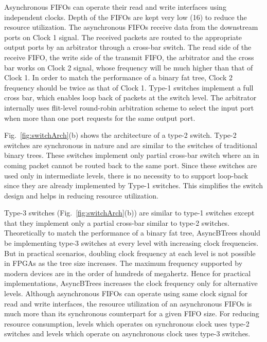 Asynchronous FIFOs can operate their read and write interfaces using independent clocks.
Depth of the FIFOs are kept very low (16) to reduce the resource utilization.
The asynchronous FIFOs receive data from the downstream ports on Clock 1 signal.
The received packets are routed to the appropriate output ports by an arbitrator through a cross-bar switch.
The read side of the receive FIFO, the write side of the transmit FIFO, the arbitrator and the cross bar works on Clock 2 signal, whose frequency will be much higher than that of Clock 1.
In order to match the performance of a binary fat tree, Clock 2 frequency should be twice as that of Clock 1.
Type-1 switches implement a full cross bar, which enables loop back of packets at the switch level.
The arbitrator internally uses flit-level round-robin arbitration scheme to select the input port when more than one port requests for the same output port.

Fig.~\ref{fig:switchArch}(b) shows the architecture of a type-2 switch.
Type-2 switches are synchronous in nature and are similar to the switches of traditional binary trees.
These switches implement only partial cross-bar switch where an in coming packet cannot be routed back to the same port.
Since these switches are used only in intermediate levels, there is no necessity to to support loop-back since they are already implemented by Type-1 switches.
This simplifies the switch design and helps in reducing resource utilization.

Type-3 switches (Fig.~\ref{fig:switchArch}(b)) are similar to type-1 switches except that they implement only a partial cross-bar similar to type-2 switches.
Theoretically to match the performance of a binary fat tree, AsyncBTrees should be implementing type-3 switches at every level with increasing clock frequencies.
But in practical scenarios, doubling clock frequency at each level is not possible in FPGAs as the tree size increases.
The maximum frequency supported by modern devices are in the order of hundreds of megahertz.
Hence for practical implementations, AsyncBTrees increases the clock frequency only for alternative levels. 
Although asynchronous FIFOs can operate using same clock signal for read and write interfaces, the resource utilization of an asynchronous FIFOs is much more than its synchronous counterpart for a given FIFO size.
For reducing resource consumption, levels which operates on synchronous clock uses type-2 switches and levels which operate on asynchronous clock uses type-3 switches.

